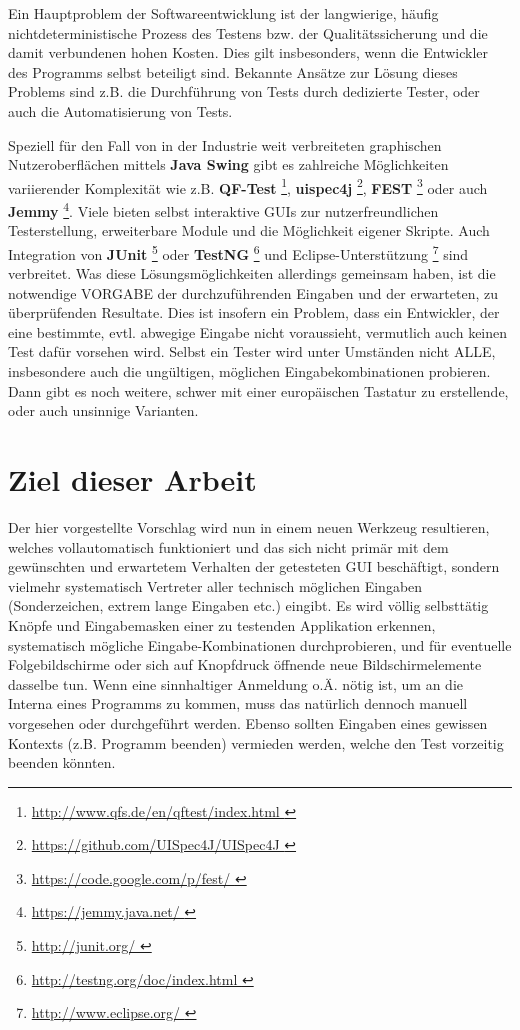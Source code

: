 Ein Hauptproblem der Softwareentwicklung ist der langwierige, häufig nichtdeterministische
Prozess des Testens bzw. der Qualitätssicherung und die damit verbundenen hohen Kosten.
Dies gilt insbesonders, wenn die Entwickler des Programms selbst beteiligt sind.
Bekannte Ansätze zur Lösung dieses Problems sind z.B. die Durchführung von Tests
durch dedizierte Tester, oder auch die Automatisierung von Tests. 
 
Speziell für den Fall von in der Industrie weit verbreiteten graphischen Nutzeroberflächen
mittels \textbf{Java Swing} \cite{JavaSwing} gibt es zahlreiche Möglichkeiten variierender
Komplexität wie z.B. \textbf{QF-Test} \footnote{\url{ http://www.qfs.de/en/qftest/index.html }},
\textbf{uispec4j} \footnote{\url{ https://github.com/UISpec4J/UISpec4J }},
\textbf{FEST} \footnote{\url{ https://code.google.com/p/fest/ }} oder auch 
\textbf{Jemmy} \footnote{\url{ https://jemmy.java.net/ }}. Viele bieten selbst interaktive
GUIs zur nutzerfreundlichen Testerstellung, erweiterbare Module und die Möglichkeit eigener Skripte. Auch
Integration von \textbf{JUnit} \footnote{\url{ http://junit.org/ }} oder 
\textbf{TestNG} \footnote{\url{ http://testng.org/doc/index.html }}
und Eclipse-Unterstützung \footnote{\url{ http://www.eclipse.org/ }} sind verbreitet. Was diese
Lösungsmöglichkeiten allerdings gemeinsam haben, ist die notwendige VORGABE der
durchzuführenden Eingaben und der erwarteten, zu überprüfenden Resultate. Dies ist
insofern ein Problem, dass ein Entwickler, der eine bestimmte, evtl. abwegige Eingabe nicht
voraussieht, vermutlich auch keinen Test dafür vorsehen wird. Selbst ein Tester wird unter
Umständen nicht ALLE, insbesondere auch die ungültigen, möglichen Eingabekombinationen probieren.
Dann gibt es noch weitere, schwer mit einer europäischen Tastatur zu erstellende, oder auch unsinnige Varianten. 
 


\section{Ziel dieser Arbeit}\label{structurelatex}


Der hier vorgestellte Vorschlag wird nun in einem neuen Werkzeug resultieren, welches vollautomatisch
funktioniert und das
sich nicht primär mit dem gewünschten und erwartetem Verhalten der getesteten GUI beschäftigt, sondern
vielmehr systematisch Vertreter aller technisch möglichen Eingaben (Sonderzeichen, extrem
lange Eingaben etc.) eingibt. Es wird völlig selbsttätig Knöpfe und Eingabemasken einer zu testenden
Applikation erkennen, systematisch mögliche Eingabe-Kombinationen durchprobieren, und für eventuelle
Folgebildschirme oder sich auf Knopfdruck öffnende neue Bildschirmelemente dasselbe tun.
Wenn eine sinnhaltiger Anmeldung o.Ä. nötig ist, um an die
\glqq{}Interna\grqq{} eines Programms zu kommen, muss das natürlich dennoch manuell vorgesehen oder
durchgeführt werden. Ebenso sollten Eingaben eines gewissen Kontexts (z.B. \glqq{}Programm beenden\grqq{})
vermieden werden, welche den Test vorzeitig beenden könnten.
 
